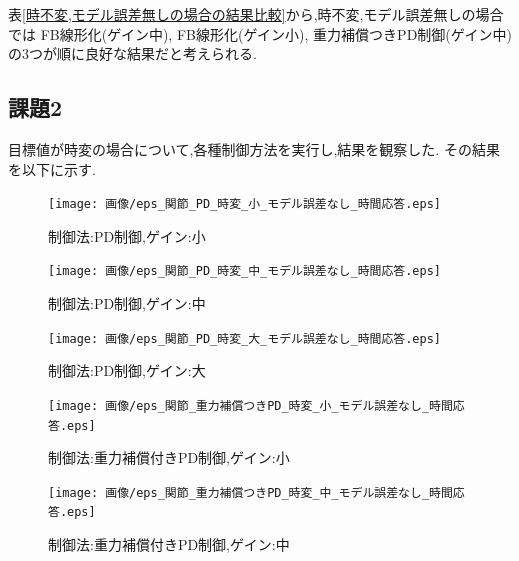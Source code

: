 \documentclass[a4paper,11pt,titlepage]{jsarticle}
\begin{document}
表\ref{時不変,モデル誤差無しの場合の結果比較}から,時不変,モデル誤差無しの場合では
FB線形化(ゲイン中), FB線形化(ゲイン小), 重力補償つきPD制御(ゲイン中)の3つが順に良好な結果だと考えられる.

\subsection{課題2}
目標値が時変の場合について,各種制御方法を実行し,結果を観察した.
その結果を以下に示す.

\begin{figure}[H]
  \begin{center}
    \texttt{[image: 画像/eps\_関節\_PD\_時変\_小\_モデル誤差なし\_時間応答.eps]}
    \caption{制御法:PD制御,ゲイン:小}
    \label{変/PD/ゲイン小}
  \end{center}
\end{figure}

\begin{figure}[H]
  \begin{center}
    \texttt{[image: 画像/eps\_関節\_PD\_時変\_中\_モデル誤差なし\_時間応答.eps]}
    \caption{制御法:PD制御,ゲイン:中}
    \label{変/PD/ゲイン中}
  \end{center}

\end{figure}
\begin{figure}[H]
  \begin{center}
    \texttt{[image: 画像/eps\_関節\_PD\_時変\_大\_モデル誤差なし\_時間応答.eps]}
    \caption{制御法:PD制御,ゲイン:大}
    \label{変/PD/ゲイン大}
  \end{center}
\end{figure}

\begin{figure}[H]
  \begin{center}
    \texttt{[image: 画像/eps\_関節\_重力補償つきPD\_時変\_小\_モデル誤差なし\_時間応答.eps]}
    \caption{制御法:重力補償付きPD制御,ゲイン:小}
    \label{変/PDG/ゲイン小}
  \end{center}
\end{figure}

\begin{figure}[H]
  \begin{center}
    \texttt{[image: 画像/eps\_関節\_重力補償つきPD\_時変\_中\_モデル誤差なし\_時間応答.eps]}
    \caption{制御法:重力補償付きPD制御,ゲイン:中}
    \label{変/PDG/ゲイン中}
  \end{center}
\end{figure}
\end{document}
